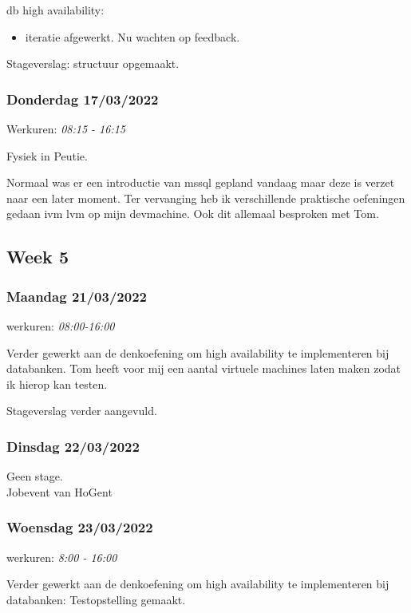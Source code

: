 db high availability:

\begin{itemize}
    \item iteratie afgewerkt. Nu wachten op feedback.
\end{itemize}

Stageverslag: structuur opgemaakt.

\subsubsection{Donderdag 17/03/2022}

Werkuren: \emph{08:15 - 16:15}

Fysiek in Peutie.

Normaal was er een introductie van \gls{mssql} gepland vandaag maar deze is
verzet naar een later moment. Ter vervanging heb ik verschillende
praktische oefeningen gedaan ivm \gls{lvm} op mijn devmachine. Ook dit
allemaal besproken met Tom.

\subsection{Week 5}

\subsubsection{Maandag 21/03/2022}

werkuren: \emph{08:00-16:00}

Verder gewerkt aan de denkoefening om high availability te implementeren
bij databanken. Tom heeft voor mij een aantal virtuele machines laten
maken zodat ik hierop kan testen.

Stageverslag verder aangevuld.

\subsubsection{Dinsdag 22/03/2022}

Geen stage.\\
Jobevent van HoGent


\subsubsection{Woensdag 23/03/2022}

werkuren: \emph{8:00 - 16:00}

Verder gewerkt aan de denkoefening om high availability te implementeren
bij databanken: Testopstelling gemaakt.

